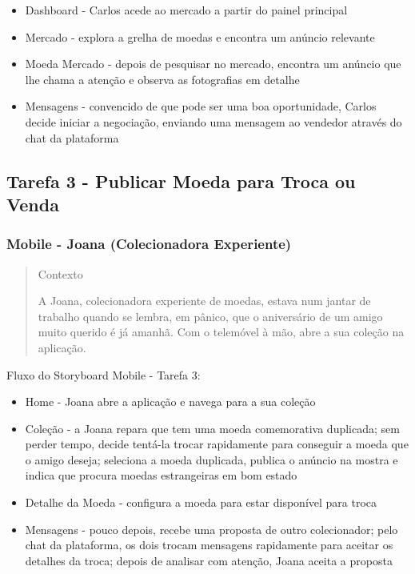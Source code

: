 \documentclass[12pt,a4paper]{article}
\begin{document}
\begin{itemize}
\setlength{\itemsep}{0.15em}
\item Dashboard - Carlos acede ao mercado a partir do painel principal
\item Mercado - explora a grelha de moedas e encontra um anúncio relevante
\item Moeda Mercado - depois de pesquisar no mercado, encontra um anúncio que lhe chama a atenção e observa as fotografias em detalhe
\item Mensagens - convencido de que pode ser uma boa oportunidade, Carlos decide iniciar a negociação, enviando uma mensagem ao vendedor através do chat da plataforma
\end{itemize}

\subsection{Tarefa 3 - Publicar Moeda para Troca ou Venda}

\subsubsection{Mobile - Joana (Colecionadora Experiente)}

\begin{quote}
\small
Contexto\par
A Joana, colecionadora experiente de moedas, estava num jantar de trabalho quando se lembra, em pânico, que o aniversário de um amigo muito querido é já amanhã. Com o telemóvel à mão, abre a sua coleção na aplicação.
\end{quote}

Fluxo do Storyboard Mobile - Tarefa 3:

\begin{itemize}
\setlength{\itemsep}{0.15em}
\item Home - Joana abre a aplicação e navega para a sua coleção
\item Coleção - a Joana repara que tem uma moeda comemorativa duplicada; sem perder tempo, decide tentá-la trocar rapidamente para conseguir a moeda que o amigo deseja; seleciona a moeda duplicada, publica o anúncio na mostra e indica que procura moedas estrangeiras em bom estado
\item Detalhe da Moeda - configura a moeda para estar disponível para troca
\item Mensagens - pouco depois, recebe uma proposta de outro colecionador; pelo chat da plataforma, os dois trocam mensagens rapidamente para aceitar os detalhes da troca; depois de analisar com atenção, Joana aceita a proposta
\end{itemize}
\end{document}
